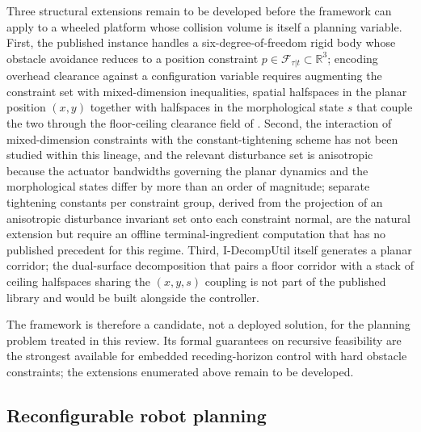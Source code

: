 \documentclass[11pt,a4paper]{article}
\begin{document}
Three structural extensions remain to be developed before the framework can apply to a wheeled platform whose collision volume is itself a planning variable. First, the published instance handles a six-degree-of-freedom rigid body whose obstacle avoidance reduces to a position constraint $p \in \mathcal{F}_{\tau|t} \subset \mathbb{R}^3$; encoding overhead clearance against a configuration variable requires augmenting the constraint set with mixed-dimension inequalities, spatial halfspaces in the planar position $(x,y)$ together with halfspaces in the morphological state $s$ that couple the two through the floor-ceiling clearance field of . Second, the interaction of mixed-dimension constraints with the constant-tightening scheme has not been studied within this lineage, and the relevant disturbance set is anisotropic because the actuator bandwidths governing the planar dynamics and the morphological states differ by more than an order of magnitude; separate tightening constants per constraint group, derived from the projection of an anisotropic disturbance invariant set onto each constraint normal, are the natural extension but require an offline terminal-ingredient computation that has no published precedent for this regime. Third, I-DecompUtil itself generates a planar corridor; the dual-surface decomposition that pairs a floor corridor with a stack of ceiling halfspaces sharing the $(x,y,s)$ coupling is not part of the published library and would be built alongside the controller.

The framework is therefore a candidate, not a deployed solution, for the planning problem treated in this review. Its formal guarantees on recursive feasibility are the strongest available for embedded receding-horizon control with hard obstacle constraints; the extensions enumerated above remain to be developed.

\subsection{Reconfigurable robot planning}
\label{sec:sq4:reconfig}
\end{document}
